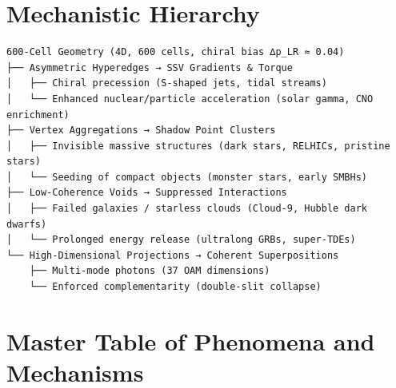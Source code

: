 \documentclass[11pt]{article}
\begin{document}
\section{Mechanistic Hierarchy}
\begin{verbatim}
600-Cell Geometry (4D, 600 cells, chiral bias ∆p_LR ≈ 0.04)
├── Asymmetric Hyperedges → SSV Gradients & Torque
│   ├── Chiral precession (S-shaped jets, tidal streams)
│   └── Enhanced nuclear/particle acceleration (solar gamma, CNO enrichment)
├── Vertex Aggregations → Shadow Point Clusters
│   ├── Invisible massive structures (dark stars, RELHICs, pristine stars)
│   └── Seeding of compact objects (monster stars, early SMBHs)
├── Low-Coherence Voids → Suppressed Interactions
│   ├── Failed galaxies / starless clouds (Cloud-9, Hubble dark dwarfs)
│   └── Prolonged energy release (ultralong GRBs, super-TDEs)
└── High-Dimensional Projections → Coherent Superpositions
    ├── Multi-mode photons (37 OAM dimensions)
    └── Enforced complementarity (double-slit collapse)
\end{verbatim}

\section{Master Table of Phenomena and Mechanisms}
\end{document}
